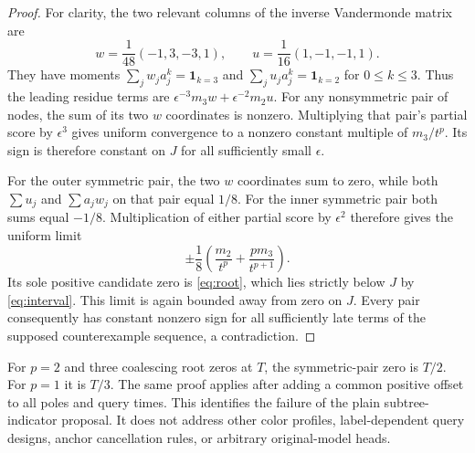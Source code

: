 \documentclass[11pt]{article}
\begin{document}
\begin{proof}
For clarity, the two relevant columns of the inverse Vandermonde
matrix are
\[
 w=\frac1{48}(-1,3,-3,1),\qquad
 u=\frac1{16}(1,-1,-1,1).
\]
They have moments $\sum_j w_j a_j^k=\mathbf1_{k=3}$ and
$\sum_j u_j a_j^k=\mathbf1_{k=2}$ for $0\leq k\leq3$.
Thus the leading residue terms are
$\epsilon^{-3}m_3w+\epsilon^{-2}m_2u$.
For any nonsymmetric pair of nodes, the sum of its two $w$
coordinates is nonzero. Multiplying that pair's partial score by
$\epsilon^3$ gives uniform convergence to a nonzero constant
multiple of $m_3/t^p$. Its sign is therefore constant on $J$ for
all sufficiently small $\epsilon$.

For the outer symmetric pair, the two $w$ coordinates sum to zero,
while both $\sum u_j$ and $\sum a_jw_j$ on that pair equal $1/8$.
For the inner symmetric pair both sums equal $-1/8$. Multiplication
of either partial score by $\epsilon^2$ therefore gives the uniform
limit
\[
 \pm\frac18\left(\frac{m_2}{t^p}
                  +\frac{p m_3}{t^{p+1}}\right).
\]
Its sole positive candidate zero is \eqref{eq:root}, which lies
strictly below $J$ by \eqref{eq:interval}. This limit is again
bounded away from zero on $J$. Every pair consequently has constant
nonzero sign for all sufficiently late terms of the supposed
counterexample sequence, a contradiction.
\end{proof}

For $p=2$ and three coalescing root zeros at $T$, the symmetric-pair
zero is $T/2$. For $p=1$ it is $T/3$. The same proof applies after
adding a common positive offset to all poles and query times.
This identifies the failure of the plain subtree-indicator proposal.
It does not address other color profiles, label-dependent query
designs, anchor cancellation rules, or arbitrary original-model heads.
\end{document}
